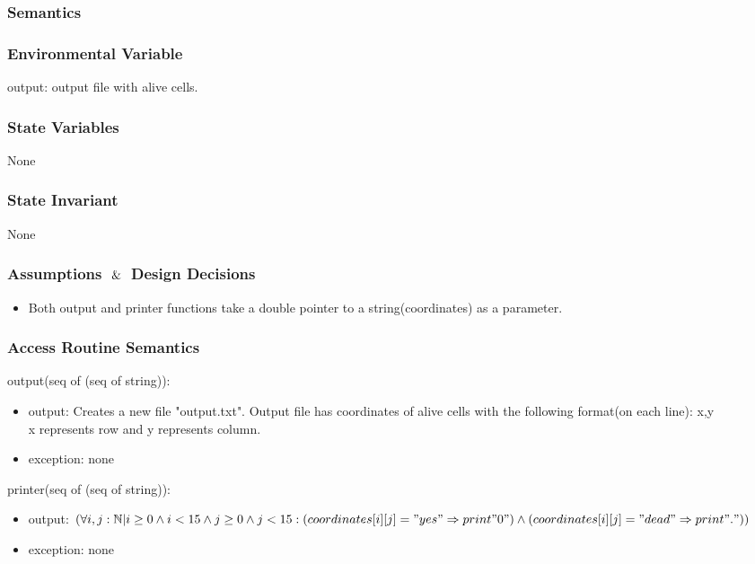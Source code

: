 \documentclass[12pt]{article}
\begin{document}
\subsubsection* {Semantics}

\subsubsection* {Environmental Variable}

output: output file with alive cells.

\subsubsection* {State Variables}

None

\subsubsection* {State Invariant}

None

\subsubsection* {Assumptions $\And$ Design Decisions}

\begin{itemize}
    \item Both output and printer functions take a double pointer to a string(coordinates) as a parameter.
\end{itemize}

\subsubsection* {Access Routine Semantics}
output(seq of (seq of string)):
\begin{itemize}
    \item output: Creates a new file "output.txt". Output file has coordinates of alive cells with the following format(on each line): x,y\\
    x represents row and y represents column.
    \item exception: none
\end{itemize}
printer(seq of (seq of string)):
\begin{itemize}
    \item output: $(\forall i,j : \mathbb{N} | i \ge 0 \land i < 15 \land j \ge 0 \land j < 15 : (coordinates[i][j] = "yes" \Rightarrow print "0") \land (coordinates[i][j] = "dead" \Rightarrow print "."))$
    \item exception: none
\end{itemize}
\end{document}
